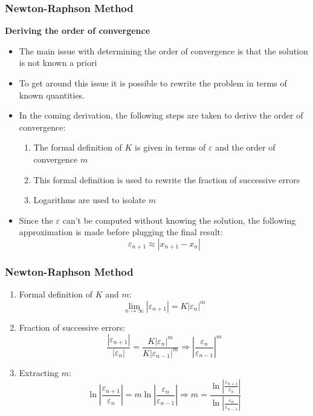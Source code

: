 \begin{frame}[fragile]
  \frametitle{Newton-Raphson Method}
    
  \textbf{Deriving the order of convergence}
  \begin{itemize}
    \item The main issue with determining the order of convergence is that the solution is not known a priori
    \item To get around this issue it is possible to rewrite the problem in terms of known quantities.
    \item In the coming derivation, the following steps are taken to derive the order of convergence:
    \begin{enumerate}
      \item The formal definition of $K$ is given in terms of $\varepsilon$ and the order of convergence $m$
      \item This formal definition is used to rewrite the fraction of successive errors
      \item Logarithms are used to isolate $m$
    \end{enumerate}
    \item Since the $\varepsilon$ can't be computed without knowing the solution, the following approximation is made before plugging the final result:
    \[\varepsilon_{n+1} \approx | x_{n+1}-x_n|\]
  \end{itemize}
\end{frame}

\begin{frame}[fragile]
    \frametitle{Newton-Raphson Method}
    \begin{enumerate}
    \item Formal definition of $K$ and $m$:
    \[\lim_{{n \to \infty}} |\varepsilon_{n+1}| = K|\varepsilon_n|^m\]
    \item Fraction of successive errors:
    \[\frac{|\varepsilon_{n+1}|}{|\varepsilon_n|} = \frac{K|\varepsilon_{n}|^m}{K|\varepsilon_{n-1}|^m} \Rightarrow \left| \frac{\varepsilon_n}{\varepsilon_{n-1}} \right|^m\]
    \item Extracting $m$:
    \[\ln \left| \frac{\varepsilon_{n+1}}{\varepsilon_n} \right| = m\ln \left| \frac{\varepsilon_n}{\varepsilon_{n-1}} \right| \Rightarrow \boxed{m = \frac{\ln \left| \frac{\varepsilon_{n+1}}{\varepsilon_n} \right|}{\ln \left| \frac{\varepsilon_n}{\varepsilon_{n-1}} \right|}}\]
    \end{enumerate}
\end{frame}

